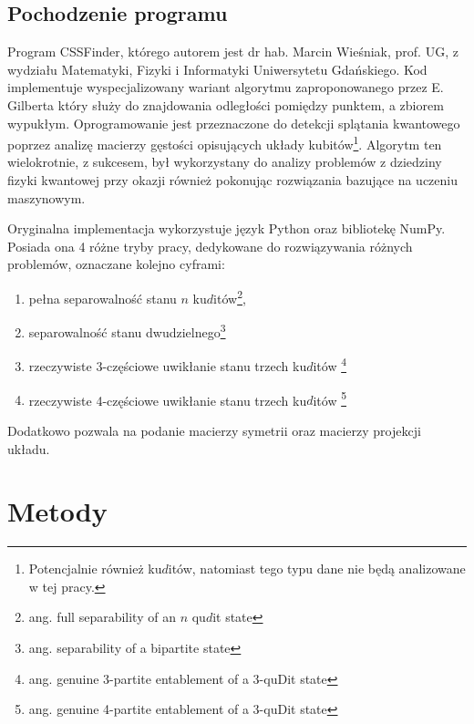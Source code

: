 \documentclass[10pt, a4paper]{article}
\begin{document}
\begin{sloppypar}
    \subsection{Pochodzenie programu}


    Program CSSFinder, którego autorem jest dr hab. Marcin Wieśniak, prof. UG, z wydziału
    Matematyki, Fizyki i Informatyki Uniwersytetu Gdańskiego. Kod implementuje wyspecjalizowany
    wariant algorytmu zaproponowanego przez E. Gilberta\cite{Lindemann_Gilbert} który służy
    do znajdowania odległości pomiędzy punktem, a zbiorem wypukłym. Oprogramowanie jest przeznaczone
    do detekcji splątania kwantowego\cite{MW_Hilbert_Schmidt_distance}\cite{MW_Variational_approach}\cite{MW_Gilbert_Quantum_Entanglement}
    poprzez analizę macierzy gęstości opisujących układy kubitów\footnote{Potencjalnie również
    ku$d$itów, natomiast tego typu dane nie będą analizowane w tej pracy.}. Algorytm ten
    wielokrotnie, z sukcesem, był wykorzystany do analizy problemów z dziedziny fizyki kwantowej\cite{MW_Hilbert_Schmidt_distance}
    przy okazji również pokonując rozwiązania bazujące na uczeniu maszynowym\cite{MW_56_Year_Algorithm}.

    Oryginalna implementacja wykorzystuje język Python oraz bibliotekę NumPy. Posiada
    ona 4 różne tryby pracy, dedykowane do rozwiązywania różnych problemów, oznaczane
    kolejno cyframi:

    \begin{enumerate}
      \item pełna separowalność stanu $n$ ku$d$itów\footnote{ang. full separability of an
        $n$ qu$d$it state},

      \item separowalność stanu dwudzielnego\footnote{ang. separability of a bipartite state}

      \item rzeczywiste 3-częściowe uwikłanie stanu trzech ku$d$itów \footnote{ang.
        genuine 3-partite entablement of a 3-quDit state}

      \item rzeczywiste 4-częściowe uwikłanie stanu trzech ku$d$itów \footnote{ang.
        genuine 4-partite entablement of a 3-quDit state}
    \end{enumerate}

    Dodatkowo pozwala na podanie macierzy symetrii oraz macierzy projekcji układu.

    \newpage


    \section{Metody}



\end{sloppypar}
\end{document}
